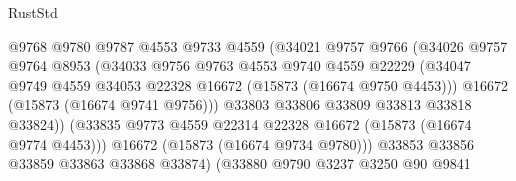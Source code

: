 \begin{lexlean}{RustStd}
\begin{coremodule}
                                    @9768
                                    @9780
                                    @9787
                                    @4553
                                    @9733
                                    @4559
                                    (@34021
                                      @9757
                                      @9766
                                      (@34026
                                        @9757
                                        @9764
                                        @8953
                                        (@34033
                                          @9756
                                          @9763
                                          @4553
                                          @9740
                                          @4559
                                          @22229
                                          (@34047
                                            @9749
                                            @4559
                                            @34053
                                            @22328
                                            @16672
                                            (@15873 (@16674 @9750 @4453)))
                                          @16672
                                          (@15873 (@16674 @9741 @9756)))
                                        @33803
                                        @33806
                                        @33809
                                        @33813
                                        @33818
                                        @33824))
                                    (@33835
                                      @9773
                                      @4559
                                      @22314
                                      @22328
                                      @16672
                                      (@15873 (@16674 @9774 @4453)))
                                    @16672
                                    (@15873 (@16674 @9734 @9780)))
                                  @33853
                                  @33856
                                  @33859
                                  @33863
                                  @33868
                                  @33874)
                                (@33880
                                  @9790
                                  @3237
                                  @3250
                                  @90
                                  @9841

\end{coremodule}
\end{lexlean}
